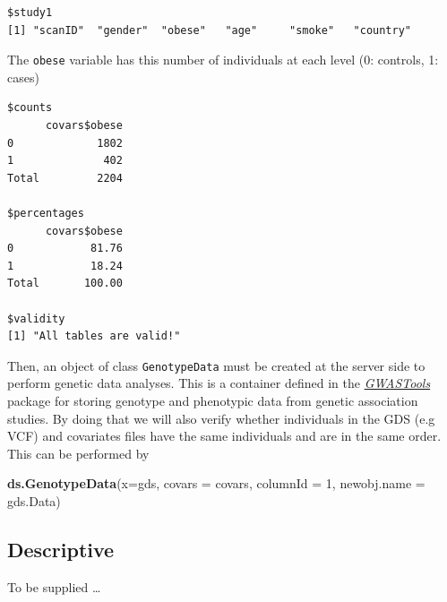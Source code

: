 \documentclass[]{article}
\newenvironment{Shaded}{\begin{snugshade}}{\end{snugshade}}
\newcommand{\DataTypeTok}[1]{\textcolor[rgb]{0.13,0.29,0.53}{#1}}
\newcommand{\DecValTok}[1]{\textcolor[rgb]{0.00,0.00,0.81}{#1}}
\newcommand{\KeywordTok}[1]{\textcolor[rgb]{0.13,0.29,0.53}{\textbf{#1}}}
\newcommand{\NormalTok}[1]{#1}
\newcommand{\StringTok}[1]{\textcolor[rgb]{0.31,0.60,0.02}{#1}}
\begin{document}
\begin{verbatim}
$study1
[1] "scanID"  "gender"  "obese"   "age"     "smoke"   "country"
\end{verbatim}

The \texttt{obese} variable has this number of individuals at each level
(0: controls, 1: cases)

\begin{Shaded}
\end{Shaded}

\begin{verbatim}
$counts
      covars$obese
0             1802
1              402
Total         2204

$percentages
      covars$obese
0            81.76
1            18.24
Total       100.00

$validity
[1] "All tables are valid!"
\end{verbatim}

Then, an object of class \texttt{GenotypeData} must be created at the
server side to perform genetic data analyses. This is a container
defined in the
\emph{\href{https://bioconductor.org/packages/3.9/GWASTools}{GWASTools}}
package for storing genotype and phenotypic data from genetic
association studies. By doing that we will also verify whether
individuals in the GDS (e.g VCF) and covariates files have the same
individuals and are in the same order. This can be performed by

\begin{Shaded}
\begin{Highlighting}[]
\KeywordTok{ds.GenotypeData}\NormalTok{(}\DataTypeTok{x=}\StringTok{\textquotesingle{}gds\textquotesingle{}}\NormalTok{, }\DataTypeTok{covars =} \StringTok{\textquotesingle{}covars\textquotesingle{}}\NormalTok{, }\DataTypeTok{columnId =} \DecValTok{1}\NormalTok{, }\DataTypeTok{newobj.name =} \StringTok{\textquotesingle{}gds.Data\textquotesingle{}}\NormalTok{)}
\end{Highlighting}
\end{Shaded}

\hypertarget{descriptive}{%
\subsection{Descriptive}\label{descriptive}}

To be supplied \ldots{}
\end{document}
